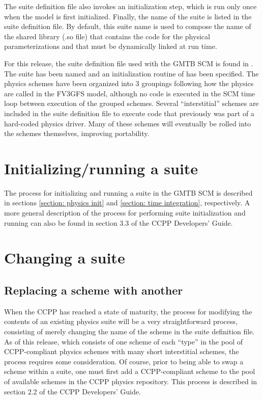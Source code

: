 The suite definition file also invokes an initialization step, which is run only once when the model is first initialized. Finally, the name of the suite is listed in the suite definition file. By default, this suite name is used to compose the name of the shared library (.so file) that contains the code for the physical parameterizations and that must be dynamically linked at run time.

For this release, the suite definition file used with the GMTB SCM is found in . The suite has been named  and an initialization routine of  has been specified. The physics schemes have been organized into 3 groupings following how the physics are called in the FV3GFS model, although no code is executed in the SCM time loop between execution of the grouped schemes. Several ``interstitial'' schemes are included in the suite definition file to execute code that previously was part of a hard-coded physics driver. Many of these schemes will eventually be rolled into the schemes themselves, improving portability.

\section{Initializing/running a suite}
The process for initializing and running a suite in the GMTB SCM is described in sections \ref{section: physics init} and \ref{section: time integration}, respectively. A more general description of the process for performing suite initialization and running can also be found in section 3.3 of the CCPP Developers' Guide.

\section{Changing a suite}

\subsection{Replacing a scheme with another}

When the CCPP has reached a state of maturity, the process for modifying the contents of an existing physics suite will be a very straightforward process, consisting of merely changing the name of the scheme in the suite definition file. As of this release, which consists of one scheme of each ``type'' in the pool of CCPP-compliant physics schemes with many short interstitial schemes, the process requires some consideration. Of course, prior to being able to swap a scheme within a suite, one must first add a CCPP-compliant scheme to the pool of available schemes in the CCPP physics repository. This process is described in section 2.2 of the CCPP Developers' Guide.

